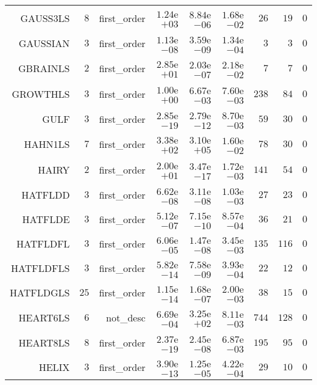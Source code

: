 \begin{longtable}{rrrrrrrrr}
GAUSS3LS & \(     8\) & first\_order & \( 1.24\)e\(+03\) & \( 8.84\)e\(-06\) & \( 1.68\)e\(-02\) & \(    26\) & \(    19\) & \(     0\) \\
GAUSSIAN & \(     3\) & first\_order & \( 1.13\)e\(-08\) & \( 3.59\)e\(-09\) & \( 1.34\)e\(-04\) & \(     3\) & \(     3\) & \(     0\) \\
GBRAINLS & \(     2\) & first\_order & \( 2.85\)e\(+01\) & \( 2.03\)e\(-07\) & \( 2.18\)e\(-02\) & \(     7\) & \(     7\) & \(     0\) \\
GROWTHLS & \(     3\) & first\_order & \( 1.00\)e\(+00\) & \( 6.67\)e\(-03\) & \( 7.60\)e\(-03\) & \(   238\) & \(    84\) & \(     0\) \\
GULF & \(     3\) & first\_order & \( 2.85\)e\(-19\) & \( 2.79\)e\(-12\) & \( 8.70\)e\(-03\) & \(    59\) & \(    30\) & \(     0\) \\
HAHN1LS & \(     7\) & first\_order & \( 3.38\)e\(+02\) & \( 3.10\)e\(+05\) & \( 1.60\)e\(-02\) & \(    78\) & \(    30\) & \(     0\) \\
HAIRY & \(     2\) & first\_order & \( 2.00\)e\(+01\) & \( 3.47\)e\(-17\) & \( 1.72\)e\(-03\) & \(   141\) & \(    54\) & \(     0\) \\
HATFLDD & \(     3\) & first\_order & \( 6.62\)e\(-08\) & \( 3.11\)e\(-08\) & \( 1.03\)e\(-03\) & \(    27\) & \(    23\) & \(     0\) \\
HATFLDE & \(     3\) & first\_order & \( 5.12\)e\(-07\) & \( 7.15\)e\(-10\) & \( 8.57\)e\(-04\) & \(    36\) & \(    21\) & \(     0\) \\
HATFLDFL & \(     3\) & first\_order & \( 6.06\)e\(-05\) & \( 1.47\)e\(-08\) & \( 3.45\)e\(-03\) & \(   135\) & \(   116\) & \(     0\) \\
HATFLDFLS & \(     3\) & first\_order & \( 5.82\)e\(-14\) & \( 7.58\)e\(-09\) & \( 3.93\)e\(-04\) & \(    22\) & \(    12\) & \(     0\) \\
HATFLDGLS & \(    25\) & first\_order & \( 1.15\)e\(-14\) & \( 1.68\)e\(-07\) & \( 2.00\)e\(-03\) & \(    38\) & \(    15\) & \(     0\) \\
HEART6LS & \(     6\) & not\_desc & \( 6.69\)e\(-04\) & \( 3.25\)e\(+02\) & \( 8.11\)e\(-03\) & \(   744\) & \(   128\) & \(     0\) \\
HEART8LS & \(     8\) & first\_order & \( 2.37\)e\(-19\) & \( 2.45\)e\(-08\) & \( 6.87\)e\(-03\) & \(   195\) & \(    95\) & \(     0\) \\
HELIX & \(     3\) & first\_order & \( 3.90\)e\(-13\) & \( 1.25\)e\(-05\) & \( 4.22\)e\(-04\) & \(    29\) & \(    10\) & \(     0\) \\

\end{longtable}

